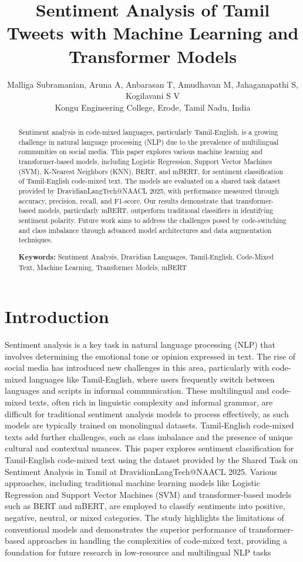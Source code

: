 \documentclass[11pt]{article}
\title{Sentiment Analysis of Tamil Tweets with Machine Learning and Transformer Models}
\author{Malliga Subramanian, Aruna A, Anbarasan T, Amudhavan M, Jahaganapathi S, Kogilavani S V \\ Kongu Engineering College, Erode, Tamil Nadu, India}
\begin{document}
\maketitle
\begin{abstract}
Sentiment analysis in code-mixed languages, particularly Tamil-English, is a growing challenge in natural language processing (NLP) due to the prevalence of multilingual communities on social media. This paper explores various machine learning and transformer-based models, including Logistic Regression, Support Vector Machines (SVM), K-Nearest Neighbors (KNN), BERT, and mBERT, for sentiment classification of Tamil-English code-mixed text. The models are evaluated on a shared task dataset provided by DravidianLangTech@NAACL 2025, with performance measured through accuracy, precision, recall, and F1-score. Our results demonstrate that transformer-based models, particularly mBERT, outperform traditional classifiers in identifying sentiment polarity. Future work aims to address the challenges posed by code-switching and class imbalance through advanced model architectures and data augmentation techniques. 

\textbf{Keywords:} Sentiment Analysis, Dravidian Languages, Tamil-English, Code-Mixed Text, Machine Learning, Transformer Models, mBERT
\end{abstract}


\section{Introduction}

Sentiment analysis is a key task in natural language processing (NLP) that involves determining the emotional tone or opinion expressed in text. The rise of social media has introduced new challenges in this area, particularly with code-mixed languages like Tamil-English, where users frequently switch between languages and scripts in informal communication. These multilingual and code-mixed texts, often rich in linguistic complexity and informal grammar, are difficult for traditional sentiment analysis models to process effectively, as such models are typically trained on monolingual datasets. Tamil-English code-mixed texts add further challenges, such as class imbalance and the presence of unique cultural and contextual nuances. This paper explores sentiment classification for Tamil-English code-mixed text using the dataset provided by the Shared Task on Sentiment Analysis in Tamil at DravidianLangTech@NAACL 2025. Various approaches, including traditional machine learning models like Logistic Regression and Support Vector Machines (SVM) and transformer-based models such as BERT and mBERT, are employed to classify sentiments into positive, negative, neutral, or mixed categories. The study highlights the limitations of conventional models and demonstrates the superior performance of transformer-based approaches in handling the complexities of code-mixed text, providing a foundation for future research in low-resource and multilingual NLP tasks
\end{document}
